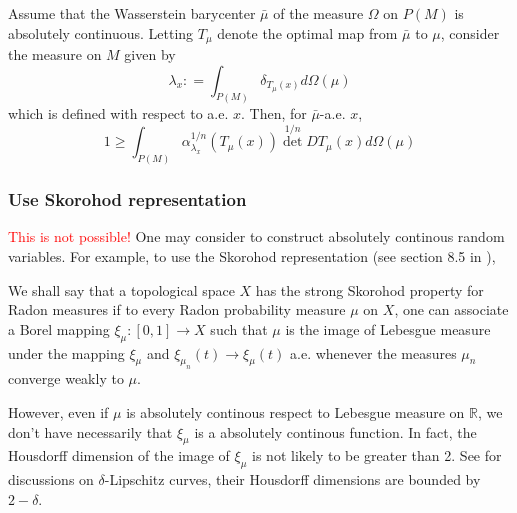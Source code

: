 \begin{thm}
	Assume that the Wasserstein barycenter \( \bar { \mu } \) of the measure \( \Omega \) on \( P ( M ) \) is absolutely continuous.
	Letting \( T _ { \mu } \) denote the optimal map from \( \bar { \mu } \) to \( \mu \), consider the measure on \( M \) given by
	\[ \lambda _ { x } : = \int _ { P ( M ) } \delta _ { T _ { \mu } ( x ) } d \Omega ( \mu ) \]
	which is defined with respect to a.e. $x$.
	Then, for \( \bar { \mu } \)-a.e. \(x\),
	\[ 1 \geq \int _ { P ( M ) } \alpha _ { \lambda _ { x } } ^ { 1 / n } \left( T _ { \mu } ( x ) \right) \operatorname { det } ^ { 1 / n } D T _ { \mu } ( x ) d \Omega ( \mu ) \]
\end{thm}


\subsubsection{Use Skorohod representation}
\textcolor{red}{This is not possible!}
One may consider to construct absolutely continous random variables.
For example, to use the Skorohod representation (see section 8.5 in \cite{Bogachev2007}),
\begin{defn}
	We shall say that a topological space \( X \) has the strong
	Skorohod property for Radon measures if to every Radon probability measure
	\( \mu \) on \( X \),
	one can associate a Borel mapping \( \xi _ { \mu } : [ 0,1 ] \rightarrow X \) such that \( \mu \) is
	the image of Lebesgue measure under the mapping \( \xi _ { \mu } \) and \( \xi _ { \mu _ { n } } ( t ) \rightarrow \xi _ { \mu } ( t ) \) a.e.
	whenever the measures \( \mu _ { n } \) converge weakly to \( \mu . \)
\end{defn}

However, even if $\mu$ is absolutely continous respect to Lebesgue measure on $\mathbb{R}$,
we don't have necessarily that $\xi_{\mu}$ is a absolutely continous function.
In fact, the Housdorff dimension of the image of $\xi_{\mu}$ is not likely to be greater than 2.
See \cite{Besicov1937Sets} for discussions on $\delta$-Lipschitz curves,
their Housdorff dimensions are bounded by $2-\delta$.

